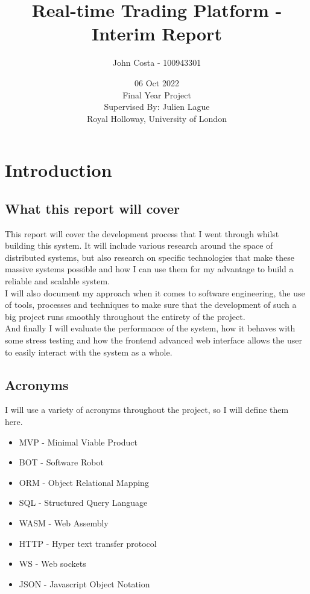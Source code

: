 \documentclass[titlepage]{article}
\title{Real-time Trading Platform - Interim Report}
\author{John Costa - 100943301}
\date{06 Oct 2022 \\
  \Large{Final Year Project \\
Supervised By: Julien Lague \\
Royal Holloway, University of London}}
\begin{document}
\maketitle

\tableofcontents
\newpage

\section{Introduction}

\subsection{What this report will cover}
This report will cover the development process that I went through whilst building this system. It will include various research around the space of distributed systems, but also research on specific technologies that make these massive systems possible and how I can use them for my advantage to build a reliable and scalable system. \\

I will also document my approach when it comes to software engineering, the use of tools, processes and techniques to make sure that the development of such a big project runs smoothly throughout the entirety of the project. \\

And finally I will evaluate the performance of the system, how it behaves with some stress testing and how the frontend advanced web interface allows the user to easily interact with the system as a whole.

\subsection{Acronyms}
I will use a variety of acronyms throughout the project, so I will define them here.

\begin{itemize}
  \item MVP - Minimal Viable Product
  \item BOT - Software Robot
  \item ORM - Object Relational Mapping
  \item SQL - Structured Query Language
  \item WASM - Web Assembly
  \item HTTP - Hyper text transfer protocol
  \item WS - Web sockets
  \item JSON - Javascript Object Notation
\end{itemize}
\end{document}
